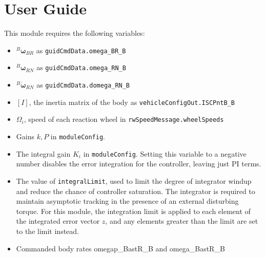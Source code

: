 \documentclass[]{BasiliskReportMemo}
\begin{document}
\section{User Guide}
This module requires the following variables:
\begin{itemize}
\item $^B\mathbf{\omega}_{BR}$  as \verb|guidCmdData.omega_BR_B|
\item $^B\mathbf{\omega}_{RN}$ as \verb|guidCmdData.omega_RN_B|
\item $^B\dot{\mathbf{\omega}}_{RN}$ as \verb|guidCmdData.domega_RN_B|
\item $[I]$, the inertia matrix of the body as \verb|vehicleConfigOut.ISCPntB_B|
\item $\Omega_i$, speed of each reaction wheel in \verb|rwSpeedMessage.wheelSpeeds|
\item Gains $k,P$ in \verb|moduleConfig|. 
\item The integral gain $K_i$ in \verb|moduleConfig|. Setting this variable to a negative number disables the error integration for the controller, leaving just PI terms. 
\item The value of \verb|integralLimit|, used to limit the degree of integrator windup and reduce the chance of controller saturation. The integrator is required to maintain asymptotic tracking in the presence of an external disturbing torque. For this module, the integration limit is applied to each element of the integrated error vector $z$, and any elements greater than the limit are set to the limit instead.
\item Commanded body rates omegap\_BastR\_B and omega\_BastR\_B

\end{itemize}



\end{document}
